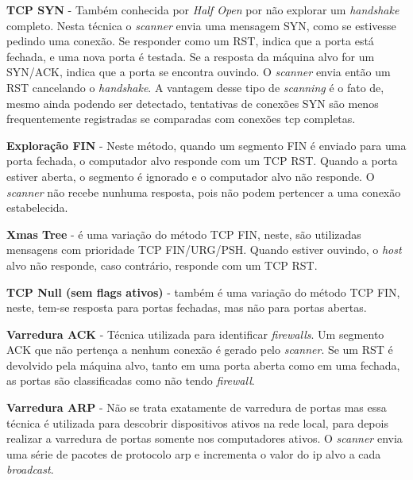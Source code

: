 \textbf{TCP SYN} - Também conhecida por \textit{Half Open} por não explorar um \textit{handshake} completo. Nesta técnica o \textit{scanner} envia uma mensagem SYN, como se estivesse pedindo uma conexão. Se responder como um RST, indica que a porta está fechada, e uma nova porta é testada. Se a resposta da máquina alvo for um SYN/ACK, indica que a porta se encontra ouvindo. O \textit{scanner} envia então um RST cancelando o \textit{handshake}. A vantagem desse tipo de \textit{scanning} é o fato de, mesmo ainda podendo ser detectado, tentativas de conexões SYN são menos frequentemente registradas se comparadas com conexões \gls{tcp} completas. %

\textbf{Exploração FIN} - Neste método, quando um segmento FIN é enviado para uma porta fechada, o computador alvo responde com um TCP RST. Quando a porta estiver aberta, o segmento é ignorado e o computador alvo não responde. O \textit{scanner} não recebe nunhuma resposta, pois não podem pertencer a uma conexão estabelecida. %

\textbf{Xmas Tree} - é uma variação do método TCP FIN, neste, são utilizadas mensagens com prioridade TCP FIN/URG/PSH. Quando estiver ouvindo, o \textit{host} alvo não responde, caso contrário, responde com um TCP RST. %

\textbf{TCP Null (sem flags ativos)} - também é uma variação do método TCP FIN, neste, tem-se resposta para portas fechadas, mas não para portas abertas.%

\textbf{Varredura ACK} - Técnica utilizada para identificar \textit{firewalls}. Um segmento ACK que não pertença a nenhum conexão é gerado pelo \textit{scanner}. Se um RST é devolvido pela máquina alvo, tanto em uma porta aberta como em uma fechada, as portas são classificadas como não tendo \textit{firewall}.

\textbf{Varredura ARP} - Não se trata exatamente de varredura de portas mas essa técnica é utilizada para descobrir dispositivos ativos na rede local, para depois realizar a varredura de portas somente nos computadores ativos. O \textit{scanner} envia uma série de pacotes de protocolo \gls{arp} \cite{RFC0826} e incrementa o valor do \gls{ip} alvo a cada \textit{broadcast}.

